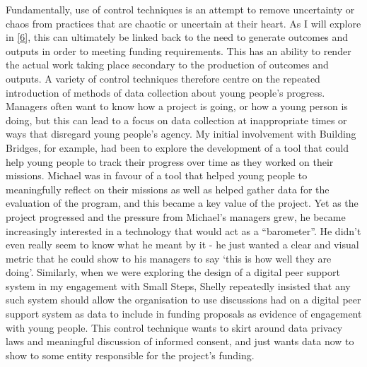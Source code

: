 Fundamentally, use of control techniques is an attempt to remove uncertainty or chaos from practices that are chaotic or uncertain at their heart. As I will explore in \ref{6}, this can ultimately be linked back to the need to generate outcomes and outputs in order to meeting funding requirements. This has an ability to render the actual work taking place secondary to the production of outcomes and outputs. A variety of control techniques therefore centre on the repeated introduction of methods of data collection about young people’s progress. Managers often want to know how a project is going, or how a young person is doing, but this can lead to a focus on data collection at inappropriate times or ways that disregard young people’s agency. My initial involvement with Building Bridges, for example, had been to explore the development of a tool that could help young people to track their progress over time as they worked on their missions. Michael was in favour of a tool that helped young people to meaningfully reflect on their missions as well as helped gather data for the evaluation of the program, and this became a key value of the project. Yet as the project progressed and the pressure from Michael’s managers grew, he became increasingly interested in a technology that would act as a “barometer”. He didn’t even really seem to know what he meant by it - he just wanted a clear and visual metric that he could show to his managers to say ‘this is how well they are doing’. Similarly, when we were exploring the design of a digital peer support system in my engagement with Small Steps, Shelly repeatedly insisted that any such system should allow the organisation to use discussions had on a digital peer support system as data to include in funding proposals as evidence of engagement with young people. This control technique wants to skirt around data privacy laws and meaningful discussion of informed consent, and just wants data now to show to some entity responsible for the project’s funding. 

